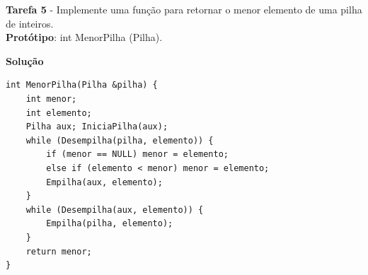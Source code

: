 \documentclass{article}
\begin{document}
\bigskip

\par
\noindent
\textbf{Tarefa 5} - Implemente uma função para retornar o menor elemento de uma pilha de inteiros.\\
\textbf{Protótipo}: int MenorPilha (Pilha).
\bigskip
\par
\noindent
\textbf{Solução}
\begin{lstlisting}
int MenorPilha(Pilha &pilha) {
    int menor;
    int elemento;
    Pilha aux; IniciaPilha(aux);
    while (Desempilha(pilha, elemento)) {
        if (menor == NULL) menor = elemento;
        else if (elemento < menor) menor = elemento;
        Empilha(aux, elemento);
    }
    while (Desempilha(aux, elemento)) {
        Empilha(pilha, elemento);
    }
    return menor;
}
\end{lstlisting}
\end{document}

